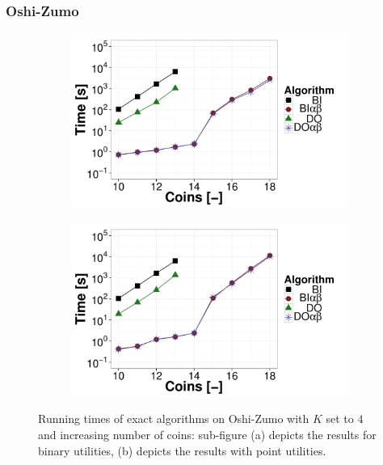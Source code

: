 \subsubsection{Oshi-Zumo}
\begin{figure}
\centering
	\begin{subfigure}{0.49\textwidth}
		\includegraphics[width=1\textwidth]{figures/OZ-K4.pdf}\caption{}\label{fig:off:res:oz4}
	\end{subfigure}
	\begin{subfigure}{0.49\textwidth}
		\includegraphics[width=1\textwidth]{figures/OZ-K4-BF.pdf}\caption{}\label{fig:off:res:oz4-bf}
	\end{subfigure}
\caption{Running times of exact algorithms on Oshi-Zumo with $K$ set to $4$ and increasing number of coins: sub-figure (a) depicts the results for binary utilities, (b) depicts the results with point utilities.} \label{fig:off:res:oz}
\end{figure}

